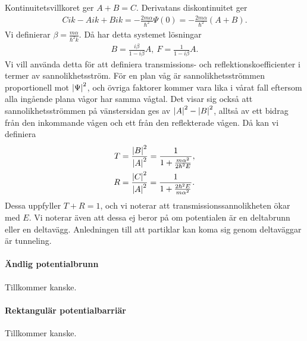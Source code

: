 Kontinuitetsvillkoret ger $A + B = C$. Derivatans diskontinuitet ger
\begin{align*}
	Cik - Aik + Bik = -\frac{2m\alpha}{\hbar^{2}}\Psi(0) = -\frac{2m\alpha}{\hbar^{2}}(A + B).
\end{align*}
Vi definierar $\beta = \frac{m\alpha}{\hbar^{2}k}$. Då har detta systemet lösningar
\begin{align*}
	B = \frac{i\beta}{1 - i\beta}A,\ F = \frac{1}{1 - i\beta}A.
\end{align*}
Vi vill använda detta för att definiera transmissions- och reflektionskoefficienter i termer av sannolikhetsström. För en plan våg är sannolikhetsströmmen proportionell mot $\abs{\Psi}^{2}$, och övriga faktorer kommer vara lika i vårat fall eftersom alla ingående plana vågor har samma vågtal. Det visar sig också att sannolikhetsströmmen på vänstersidan ges av $\abs{A}^{2} - \abs{B}^{2}$, alltså av ett bidrag från den inkommande vågen och ett från den reflekterade vågen. Då kan vi definiera
\begin{align*}
	T &= \frac{\abs{B}^{2}}{\abs{A}^{2}} = \frac{1}{1 + \frac{m\alpha^{2}}{2\hbar^{2}E}}, \\
	R &= \frac{\abs{C}^{2}}{\abs{A}^{2}} = \frac{1}{1 + \frac{2\hbar^{2}E}{m\alpha^{2}}}.
\end{align*}
Dessa uppfyller $T + R = 1$, och vi noterar att transmissionssannolikheten ökar med $E$. Vi noterar även att dessa ej beror på om potentialen är en deltabrunn eller en deltavägg. Anledningen till att partiklar kan koma sig genom deltaväggar är tunneling.

\paragraph{Ändlig potentialbrunn}
Tillkommer kanske.

\paragraph{Rektangulär potentialbarriär}
Tillkommer kanske.